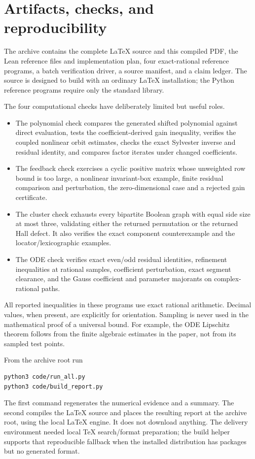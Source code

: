 \section{Artifacts, checks, and reproducibility}\label{sec:artifacts}

The archive contains the complete LaTeX source and this compiled PDF, the Lean reference files and implementation plan, four exact-rational reference programs, a batch verification driver, a source manifest, and a claim ledger. The source is designed to build with an ordinary LaTeX installation; the Python reference programs require only the standard library.

The four computational checks have deliberately limited but useful roles.
\begin{itemize}[leftmargin=*,itemsep=3pt]
\item The polynomial check compares the generated shifted polynomial against direct evaluation, tests the coefficient-derived gain inequality, verifies the coupled nonlinear orbit estimates, checks the exact Sylvester inverse and residual identity, and compares factor iterates under changed coefficients.
\item The feedback check exercises a cyclic positive matrix whose unweighted row bound is too large, a nonlinear invariant-box example, finite residual comparison and perturbation, the zero-dimensional case and a rejected gain certificate.
\item The cluster check exhausts every bipartite Boolean graph with equal side size at most three, validating either the returned permutation or the returned Hall defect. It also verifies the exact component counterexample and the locator/lexicographic examples.
\item The ODE check verifies exact even/odd residual identities, refinement inequalities at rational samples, coefficient perturbation, exact segment clearance, and the Gauss coefficient and parameter majorants on complex-rational paths.
\end{itemize}

All reported inequalities in these programs use exact rational arithmetic. Decimal values, when present, are explicitly for orientation. Sampling is never used in the mathematical proof of a universal bound. For example, the ODE Lipschitz theorem follows from the finite algebraic estimates in the paper, not from its sampled test points.

From the archive root run
\begin{lstlisting}
python3 code/run_all.py
python3 code/build_report.py
\end{lstlisting}
The first command regenerates the numerical evidence and a summary. The second compiles the LaTeX source and places the resulting report at the archive root, using the local LaTeX engine. It does not download anything. The delivery environment needed local TeX search/format preparation; the build helper supports that reproducible fallback when the installed distribution has packages but no generated format.

